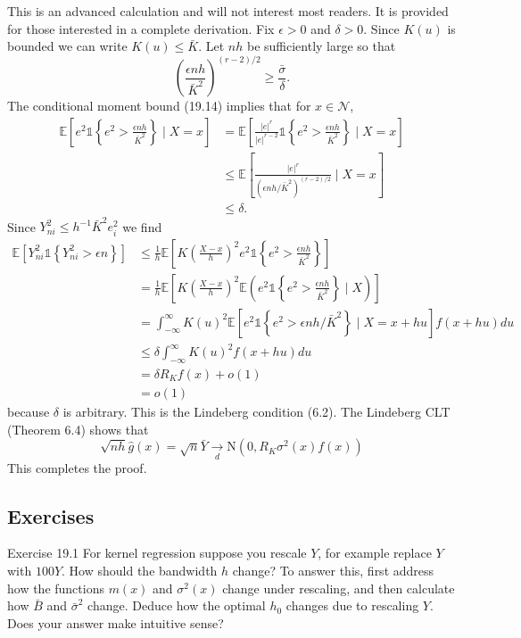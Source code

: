 \documentclass[10pt]{article}
\begin{document}
This is an advanced calculation and will not interest most readers. It is provided for those interested in a complete derivation. Fix $\epsilon>0$ and $\delta>0$. Since $K(u)$ is bounded we can write $K(u) \leq \bar{K}$. Let $n h$ be sufficiently large so that
$$
\left(\frac{\epsilon n h}{\bar{K}^{2}}\right)^{(r-2) / 2} \geq \frac{\bar{\sigma}}{\delta} .
$$
The conditional moment bound (19.14) implies that for $x \in \mathscr{N}$,
$$
\begin{aligned}
\mathbb{E}\left[e^{2} \mathbb{1}\left\{e^{2}>\frac{\epsilon n h}{\bar{K}^{2}}\right\} \mid X=x\right] &=\mathbb{E}\left[\frac{|e|^{r}}{|e|^{r-2}} \mathbb{1}\left\{e^{2}>\frac{\epsilon n h}{\bar{K}^{2}}\right\} \mid X=x\right] \\
& \leq \mathbb{E}\left[\frac{|e|^{r}}{\left(\epsilon n h / \bar{K}^{2}\right)^{(r-2) / 2}} \mid X=x\right] \\
& \leq \delta .
\end{aligned}
$$
Since $Y_{n i}^{2} \leq h^{-1} \bar{K}^{2} e_{i}^{2}$ we find
$$
\begin{aligned}
\mathbb{E}\left[Y_{n i}^{2} \mathbb{1}\left\{Y_{n i}^{2}>\epsilon n\right\}\right] & \leq \frac{1}{h} \mathbb{E}\left[K\left(\frac{X-x}{h}\right)^{2} e^{2} \mathbb{1}\left\{e^{2}>\frac{\epsilon n h}{\bar{K}^{2}}\right\}\right] \\
&=\frac{1}{h} \mathbb{E}\left[K\left(\frac{X-x}{h}\right)^{2} \mathbb{E}\left(e^{2} \mathbb{1}\left\{e^{2}>\frac{\epsilon n h}{\bar{K}^{2}}\right\} \mid X\right)\right] \\
&=\int_{-\infty}^{\infty} K(u)^{2} \mathbb{E}\left[e^{2} \mathbb{1}\left\{e^{2}>\epsilon n h / \bar{K}^{2}\right\} \mid X=x+h u\right] f(x+h u) d u \\
& \leq \delta \int_{-\infty}^{\infty} K(u)^{2} f(x+h u) d u \\
&=\delta R_{K} f(x)+o(1) \\
&=o(1)
\end{aligned}
$$
because $\delta$ is arbitrary. This is the Lindeberg condition (6.2). The Lindeberg CLT (Theorem 6.4) shows that
$$
\sqrt{n h} \widehat{g}(x)=\sqrt{n} \bar{Y} \underset{d}{\longrightarrow} \mathrm{N}\left(0, R_{K} \sigma^{2}(x) f(x)\right)
$$
This completes the proof.

\subsection{Exercises}
Exercise 19.1 For kernel regression suppose you rescale $Y$, for example replace $Y$ with $100 Y$. How should the bandwidth $h$ change? To answer this, first address how the functions $m(x)$ and $\sigma^{2}(x)$ change under rescaling, and then calculate how $\bar{B}$ and $\bar{\sigma}^{2}$ change. Deduce how the optimal $h_{0}$ changes due to rescaling $Y$. Does your answer make intuitive sense?
\end{document}
